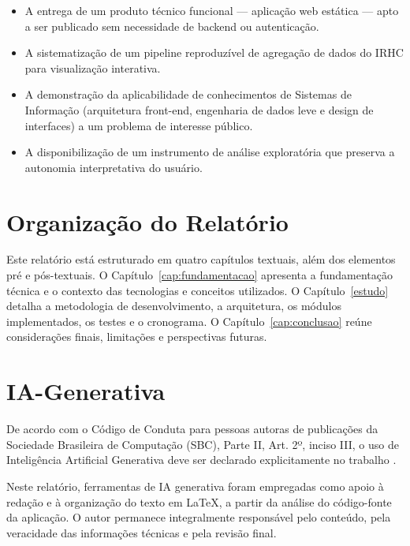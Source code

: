 \begin{itemize}
	\item A entrega de um produto técnico funcional --- aplicação web estática --- apto a ser publicado sem necessidade de backend ou autenticação.
	\item A sistematização de um pipeline reproduzível de agregação de dados do \acs{IRHC} para visualização interativa.
	\item A demonstração da aplicabilidade de conhecimentos de Sistemas de Informação (arquitetura front-end, engenharia de dados leve e design de interfaces) a um problema de interesse público.
	\item A disponibilização de um instrumento de análise exploratória que preserva a autonomia interpretativa do usuário.
\end{itemize}

\section{Organização do Relatório}

Este relatório está estruturado em quatro capítulos textuais, além dos elementos pré e pós-textuais. O Capítulo~\ref{cap:fundamentacao} apresenta a fundamentação técnica e o contexto das tecnologias e conceitos utilizados. O Capítulo~\ref{estudo} detalha a metodologia de desenvolvimento, a arquitetura, os módulos implementados, os testes e o cronograma. O Capítulo~\ref{cap:conclusao} reúne considerações finais, limitações e perspectivas futuras.

\section{IA-Generativa}

De acordo com o Código de Conduta para pessoas autoras de publicações da Sociedade Brasileira de Computação (SBC), Parte II, Art. 2º, inciso III, o uso de Inteligência Artificial Generativa deve ser declarado explicitamente no trabalho \cite{sbc_conduta}.

Neste relatório, ferramentas de IA generativa foram empregadas como apoio à redação e à organização do texto em \LaTeX{}, a partir da análise do código-fonte da aplicação. O autor permanece integralmente responsável pelo conteúdo, pela veracidade das informações técnicas e pela revisão final.
